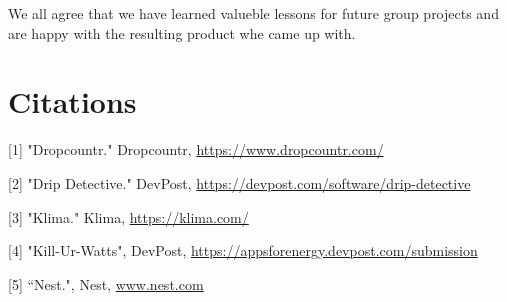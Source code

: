 \documentclass[10pt]{article}
\begin{document}
\begin{multicols*}{2}
\begin{itemize}
\end{itemize}

We all agree that we have learned valueble lessons for future group projects and are happy with the resulting product whe came up with.

\end{multicols*}

\clearpage
\section{Citations}
[1] "Dropcountr." Dropcountr, \href{https://www.dropcountr.com/}{https://www.dropcountr.com/}

[2] "Drip Detective." DevPost, \href{https://devpost.com/software/drip-detective}{https://devpost.com/software/drip-detective}

[3] "Klima." Klima, \href{https://klima.com/}{https://klima.com/}

[4] "Kill-Ur-Watts", DevPost, \href{https://appsforenergy.devpost.com/submission}{https://appsforenergy.devpost.com/submission}

[5] “Nest.", Nest, \href{http://www.nest.com}{www.nest.com}
\end{document}

